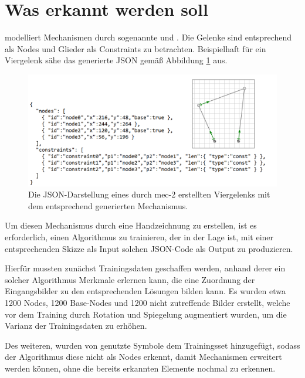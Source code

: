 \section{Was erkannt werden soll}
 modelliert Mechanismen durch
sogenannte  und .
Die Gelenke sind entsprechend als Nodes und Glieder als Constraints zu betrachten.
Beispielhaft für ein Viergelenk sähe das generierte JSON gemäß Abbildung \ref{fig:4bar} aus.

\begin{figure}
  \includegraphics[width=\textwidth]{images/4bar_json}
  \caption{Die JSON-Darstellung eines durch mec-2 erstellten Viergelenks mit dem entsprechend generierten Mechanismus.}
  \label{fig:4bar}
\end{figure}

Um diesen Mechanismus durch eine Handzeichnung zu erstellen, ist es erforderlich, einen Algorithmus zu trainieren, der in der Lage ist, mit einer entsprechenden Skizze als Input solchen JSON-Code als Output zu produzieren.

Hierfür mussten zunächst Trainingsdaten geschaffen werden, anhand derer ein solcher Algorithmus Merkmale erlernen kann, die eine Zuordnung der Eingangsbilder zu den entsprechenden Lösungen bilden kann.
Es wurden etwa 1200 Nodes, 1200 Base-Nodes und 1200 nicht zutreffende Bilder erstellt, welche vor dem Training durch Rotation und Spiegelung augmentiert wurden, um die Varianz der Trainingsdaten zu erhöhen.

Des weiteren, wurden von  genutzte Symbole dem Trainingsset hinzugefügt, sodass der Algorithmus diese nicht als Nodes erkennt, damit Mechanismen erweitert werden können, ohne die bereits erkannten Elemente nochmal zu erkennen.

